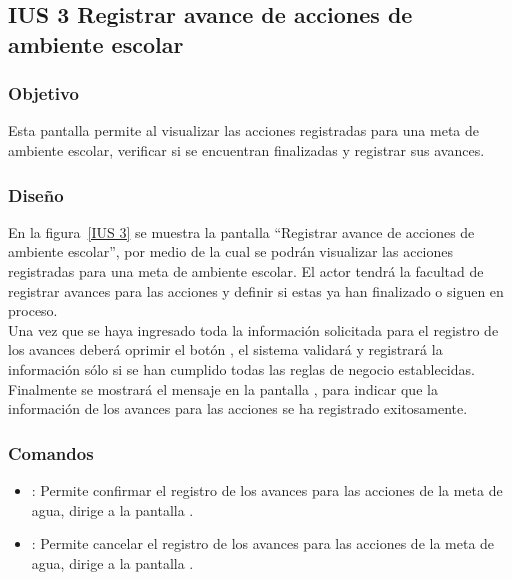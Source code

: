 \subsection{IUS 3 Registrar avance de acciones de ambiente escolar}

\subsubsection{Objetivo}

Esta pantalla permite al  visualizar las acciones registradas para una meta de ambiente escolar, verificar si se encuentran finalizadas y registrar sus avances. 
    
\subsubsection{Diseño}

    En la figura~\ref{IUS 3} se muestra la pantalla ``Registrar avance de acciones de ambiente escolar'', por medio de la cual se podrán visualizar las acciones registradas para una meta de ambiente escolar. El actor tendrá la facultad de registrar avances para las acciones y definir si estas ya han finalizado o siguen en proceso.\\
        
    Una vez que se haya ingresado toda la información solicitada para el registro de los avances deberá oprimir el botón , el sistema validará y registrará la información sólo si se han cumplido todas las reglas de negocio establecidas.\\
    
    Finalmente se mostrará el mensaje  en la pantalla , para indicar que la información de los avances para las acciones se ha registrado exitosamente.
        


\subsubsection{Comandos}
    \begin{itemize} 
    \item {}: Permite confirmar el registro de los avances para las acciones de la meta de agua, dirige a la pantalla .
    \item {}: Permite cancelar el registro de los avances para las acciones de la meta de agua, dirige a la pantalla .
    \end{itemize}


